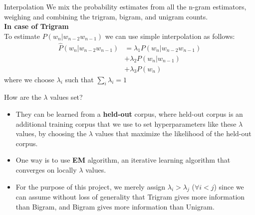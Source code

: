 \documentclass{beamer}
\begin{document}
\begin{frame}{Interpolation}
We mix the probability estimates from all the n-gram estimators, weighing and combining the trigram, bigram, and unigram counts.\\
    \textbf{In case of Trigram}\\
    To estimate $P(w_n|w_{n-2}w_{n-1})$ we can use simple interpolation as follows:
    \begin{align*}
        \hat{P} (w_n|w_{n-2}w_{n-1}) &= \lambda_1P(w_n|w_{n-2}w_{n-1})\\
                                     &+ \lambda_2P(w_n|w_{n-1})\\
                                     &+ \lambda_3P(w_n)
    \end{align*}
    where we choose $\lambda_i$ such that $\sum_i\lambda_i = 1$
\end{frame}

\begin{frame}{How are the $\lambda$ values set?}
    \begin{itemize}
        \item They can be learned from a \textbf{held-out} corpus, where held-out corpus is an additional training corpus that we use to set hyperparameters like these $\lambda$ values, by choosing the $\lambda$ values that maximize the likelihood of the held-out corpus.\\
        \item One way is to use \textbf{EM} algorithm, an iterative learning algorithm that converges on locally $\lambda$ values.
        \item For the purpose of this project, we merely assign $\lambda_i > \lambda_j$ ($\forall i < j$) since we can assume without loss of generality that Trigram gives more information than Bigram, and Bigram gives more information than Unigram.
    \end{itemize}
\end{frame}
\end{document}
